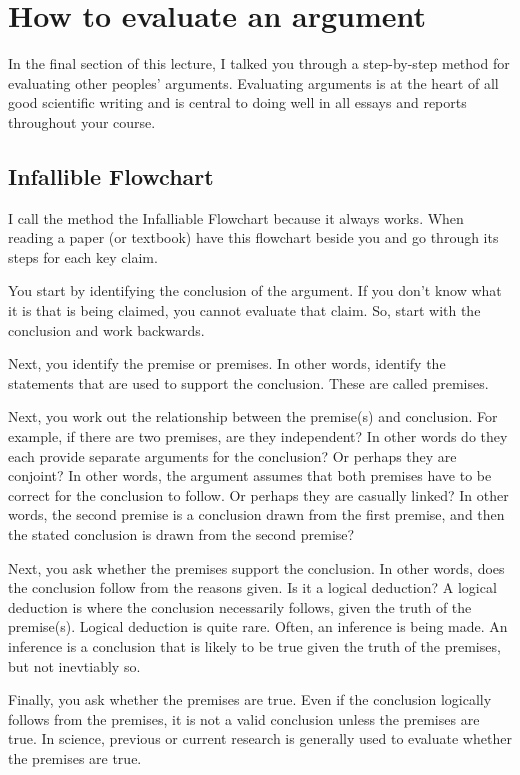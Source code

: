 \documentclass[12pt]{article}
\begin{document}
\section{How to evaluate an argument}

In the final section of this lecture, I talked you through a
step-by-step method for evaluating other peoples'
arguments. Evaluating arguments is at the heart of all good scientific
writing and is central to doing well in all essays and reports
throughout your course.

\subsection{Infallible Flowchart}

I call the method the Infalliable Flowchart because it always
works. When reading a paper (or textbook) have this flowchart beside
you and go through its steps for each key claim.

You start by identifying the conclusion of the argument. If you don't
know what it is that is being claimed, you cannot evaluate that
claim. So, start with the conclusion and work backwards.

Next, you identify the premise or premises. In other words, identify
the statements that are used to support the conclusion. These are
called premises.

Next, you work out the relationship between the premise(s) and
conclusion. For example, if there are two premises, are they
independent? In other words do they each provide separate arguments
for the conclusion? Or perhaps they are conjoint? In other words, the
argument assumes that both premises have to be correct for the
conclusion to follow. Or perhaps they are casually linked? In other
words, the second premise is a conclusion drawn from the first
premise, and then the stated conclusion is drawn from the second
premise?

Next, you ask whether the premises support the conclusion. In other
words, does the conclusion follow from the reasons given. Is it a
logical deduction? A logical deduction is where the conclusion
necessarily follows, given the truth of the premise(s). Logical
deduction is quite rare. Often, an inference is being made. An
inference is a conclusion that is likely to be true given the truth of
the premises, but not inevtiably so.

Finally, you ask whether the premises are true. Even if the
conclusion logically follows from the premises, it is not a valid
conclusion unless the premises are true. In science, previous or
current research is generally used to evaluate whether the premises
are true.
\end{document}
